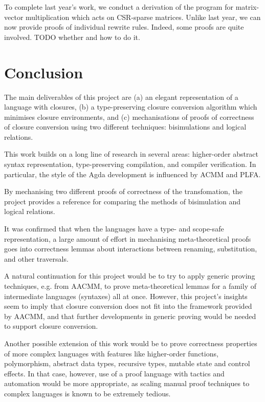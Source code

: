 \documentclass[bsc,frontabs,oneside,singlespacing,parskip,deptreport]{infthesis}
\theoremstyle{definition}
\theoremstyle{lemma}
\begin{document}
To complete last year's work, we conduct a derivation of the program
for matrix-vector multiplication which acts on CSR-sparse
matrices. Unlike last year, we can now provide proofs of individual
rewrite rules. Indeed, some proofs are quite involved. TODO whether
and how to do it.




\chapter{Conclusion}
\label{cha:conclusion}

The main deliverables of this project are (a) an elegant
representation of a language with closures, (b) a type-preserving
closure conversion algorithm which minimises closure environments, and
(c) mechanisations of proofs of correctness of closure conversion
using two different techniques: bisimulations and logical relations.

This work builds on a long line of research in several areas:
higher-order abstract syntax representation, type-preserving
compilation, and compiler verification. In particular, the style of
the Agda development is influenced by ACMM and PLFA.

By mechanising two different proofs of correctness of the
transfomation, the project provides a reference for comparing the
methods of bisimulation and logical relations.

It was confirmed that when the languages have a type- and scope-safe
representation, a large amount of effort in mechanising
meta-theoretical proofs goes into correctness lemmas about
interactions between renaming, substitution, and other traversals.

A natural continuation for this project would be to try to apply
generic proving techniques, e.g. from AACMM, to prove meta-theoretical
lemmas for a family of intermediate languages (syntaxes) all at
once. However, this project's insights seem to imply that closure
conversion does not fit into the framework provided by AACMM, and that
further developments in generic proving would be needed to support
closure conversion.

Another possible extension of this work would be to prove correctness
properties of more complex languages with features like higher-order
functions, polymorphism, abstract data types, recursive types, mutable
state and control effects. In that case, however, use of a proof
language with tactics and automation would be more appropriate, as
scaling manual proof techniques to complex languages is known to be
extremely tedious.
\end{document}
